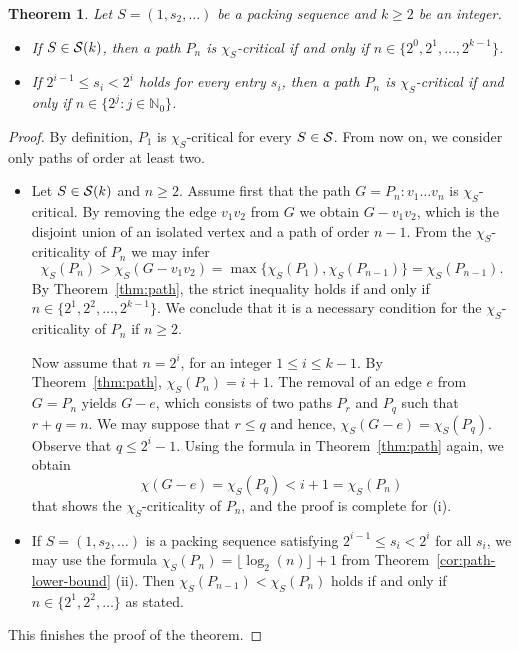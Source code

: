 \documentclass[12pt]{article}
\newtheorem{theorem}{Theorem}[section]
\newcommand{\cS}{{\cal S}}
\begin{document}
 \begin{theorem} \label{thm:critical-path} Let $S=(1,s_2, \dots)$ be a packing sequence and $k \ge 2$ be an integer. 
 \begin{itemize}
     \item[(i)] If $S \in \cS(k)$, then a path $P_n$ is $\chi_S$-critical if and only if $n \in \{2^0, 2^1, \dots, 2^{k-1}\}$.
     \item[(ii)] If $2^{i-1} \le s_i < 2^i$ holds for every entry $s_i$, then a path $P_n$ is $\chi_S$-critical if and only if $n \in \{2^j \colon  j \in \mathbb{N}_{0}\}$.
 \end{itemize}
       
   \end{theorem}
   \begin{proof}
       By definition, $P_1$ is $\chi_S$-critical for every $S \in \cS$. From now on, we consider only paths of order at least two.    
    \begin{itemize}
    \item[(i)] Let $S \in \cS(k)$ and $n \ge 2$. Assume first that the path $G=P_n\colon v_1\dots v_n$ is $\chi_S$-critical. By removing the edge $v_1v_2$ from $G$ we obtain $G-v_1v_2$, which is the disjoint union of an isolated vertex and a path of order $n-1$. From the $\chi_S$-criticality of $P_n$  we may infer
       $$\chi_S(P_n) > \chi_S(G-v_1v_2) = \max\{ \chi_S(P_1), \chi_S(P_{n-1})\} = \chi_S(P_{n-1}).
       $$
       By Theorem~\ref{thm:path}, the strict inequality holds if and only if $n \in \{2^1, 2^2, \dots, 2^{k-1}\}$. We conclude that it is a necessary condition for the $\chi_S$-criticality of $P_n$ if $n \ge 2$.

       Now assume that $n=2^{i}$, for an integer $1 \le i \le k-1$. By Theorem~\ref{thm:path}, $\chi_S(P_n)= i+1$. The removal of an edge $e$ from $G=P_n$ yields $G-e$, which consists of two paths $P_r$ and $P_q$ such that $r+q= n$. We may suppose that $r \le q$ and hence,  $\chi_S(G-e)= \chi_S(P_q)$. Observe that $q \leq 2^i-1$.
       Using the formula in  Theorem~\ref{thm:path} again, we obtain
       $$\chi(G-e)= \chi_S(P_q) < i+1 =  \chi_S(P_n)
       $$
        that shows the $\chi_S$-criticality of $P_n$, and the proof is complete for (i).

     \item[(ii)]  If $S=(1,s_2, \dots )$ is a packing sequence satisfying $2^{i-1} \leq s_i < 2^i$ for all $s_i$, we may use the formula $\chi_S(P_n)=  \lfloor \log_2(n) \rfloor +1$ from Theorem~\ref{cor:path-lower-bound} (ii). Then $\chi_S(P_{n-1}) < \chi_S (P_n)$ holds if and only if $n \in \{2^1, 2^2, \dots \}$ as stated. 
     \end{itemize}
   This finishes the proof of the theorem.
    \end{proof}
\end{document}
